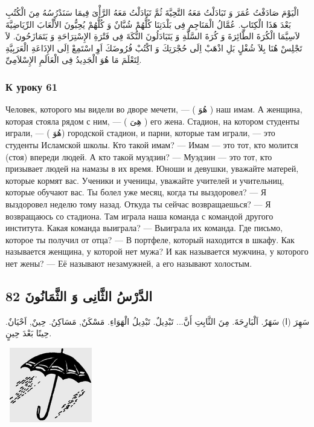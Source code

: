 \documentclass[a5paper]{article}
\begin{document}
الْيَوْمَ صَادَفْتُ عُمَرَ وَ تَبَادَلْتُ مَعَهُ التَّحِيَّةَ ثُمَّ تَبَادَلْتُ مَعَهُ الرَّأْىَ فِيمَا سَنَدْرُسُهُ مِنَ الْكُتُبِ بَعْدَ هَذَا الْكِتَابِ. عُمَّالُ الْمَنَاجِمِ فِى بَلْدَتِنَا كُلُّهُمْ شُبَّانٌ وَ كُلُّهُمْ يُحِبُّونَ الأَلْعَابَ الرِّيَاضِيَّةَ لاَسِيَّمَا الْكُرَةَ الطَّائِرَةَ وَ كُرَةَ السَّلَّةِ وَ يَتَبَادَلُونَ النُّكَةَ فِى فَتْرَةِ الإِسْتِرَاحَةِ وَ يَتَمَازَحُونَ. لاَ تَجْلِسْ هُنَا بِلاَ شُغْلٍ بَلِ اذْهَبْ اِلَى حُجْرَتِكَ وَ اكْتُبْ فُرُوضَكَ اَوِ اسْتَمِعْ اِلَى الإِذَاعَةِ الْعَرَبِيَّةِ لِتَعْلَمَ مَا هُوَ الْجَدِيدُ فِى الْعَالَمِ الإِسْلاَمِىِّ.

\subsubsection{К уроку 61}
Человек, которого мы видели во дворе мечети, — ( هُوَ ) наш имам. А женщина, которая стояла рядом с ним, — ( هِىَ ) его жена. Стадион, на котором студенты играли, — ( هُوَ) городской стадион, и парни, которые там играли, — это студенты Исламской школы. Кто такой имам? — Имам — это тот, кто молится (стоя) впереди людей. А кто такой муэдзин? — Муэдзин — это тот, кто призывает людей на намазы в их время. Юноши и девушки, уважайте матерей, которые кормят вас. Ученики и ученицы, уважайте учителей и учительниц, которые обучают вас. Ты болел уже месяц, когда ты выздоро­вел? — Я выздоровел неделю тому назад. Откуда ты сейчас возвращаешься? — Я возвращаюсь со стадиона. Там играла наша команда с командой другого института. Какая команда выиграла? — Выиграла их команда. Где письмо, которое ты получил от отца? — В портфеле, который находится в шкафу. Как называется женщина, у которой нет мужа? И как называется мужчина, у которого нет жены? — Её называют незамужней, а его называют холостым.

\subsection{الدَّرْسُ الثَّانِى وَ الثَّمَانُونَ 82}
سَهِرَ (ا) سَهَرٌ. اَلْبَارِحَةَ. مِنَ الثَّابِتِ أَنَّ... تَبْدِيلٌ. تَبْدِيلُ الْهَوَاءِ. مَسْكَنٌ, مَسَاكِنُ. حِينٌ, اَحْيَانٌ. حِينًا بَعْدَ حِينٍ. 

\  \includegraphics[width=1.4165in,height=1.2811in]{images/MuhammadBagauddinprettified-img235.png} 
\end{document}
